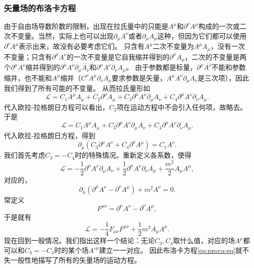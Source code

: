 \documentclass[hyperref, UTF8, a4paper]{ctexart}
\begin{document}
\subsubsection{矢量场的布洛卡方程}

由于自由场导数阶数的限制，出现在拉氏量中的只能是$A^\mu$和$\partial^\nu A^\mu$构成的一次或二次不变量。当然，实际上也可以出现$\partial_\mu A^\nu$或者$\partial_\mu A_\mu$这种，但因为它们都可以使用$\partial^\nu A^\mu$表示出来，故没有必要考虑它们。
只含有$A^\mu$二次不变量为$A^\mu A_\mu$，没有一次不变量；只含有$\partial^\mu A^\nu$的一次不变量是它自我缩并得到的$\partial^\mu A_\mu$，二次的不变量是两个$\partial^\mu A^\nu$缩并得到的$\partial^\mu A^\nu \partial_\mu A_\nu$和$\partial^\mu A^\nu \partial_\nu A_\mu$。
由于参数都是标量，$\partial^\mu A^\nu$不能和参数缩并，也不能和$A^\mu$缩并（$C^\nu A^\mu \partial_\nu A_\mu$要求参数是矢量，$A^\mu A^\nu \partial_\mu A_\nu$是三次项），因此我们得到了所有可能的不变量。
从而拉氏量形如
\[
    \mathcal{L} = C_1 A^\mu A_\mu + C_2 \partial^\mu A_\mu + C_3 \partial^\mu A^\nu \partial_\mu A_\nu + C_4 \partial^\mu A^\nu \partial_\nu A_\mu.
\]
代入欧拉-拉格朗日方程可以看出，$C_2$项在运动方程中不会引入任何项，故略去。
于是
\[
    \mathcal{L} = C_1 A^\mu A_\mu + C_3 \partial^\mu A^\nu \partial_\mu A_\nu + C_4 \partial^\mu A^\nu \partial_\nu A_\mu.
\]
代入欧拉-拉格朗日方程，得到
\begin{equation}
    \partial_\mu (C_3 \partial^\mu A^\nu +  C_4 \partial^\nu A^\mu) = C_1 A^\nu.
    \label{eq:vector-motion-eq}
\end{equation}
我们首先考虑$C_3 = - C_4$时的特殊情况。重新定义各系数，使得
\begin{equation}
    \mathcal{L} = - \frac{1}{2} \partial^\mu A^\nu \partial_\mu A_\nu + \frac{1}{2} \partial^\mu A^\nu \partial_\nu A_\mu + \frac{m^2}{2} A_\mu A^\mu,
\end{equation}
对应的，
\begin{equation}
    \partial_\mu (\partial^\mu A^\nu - \partial^\nu A^\mu) + m^2 A^\nu = 0.
    \label{eq:proca-eq}
\end{equation}
常定义
\begin{equation}
    F^{\mu \nu} = \partial^\mu A^\nu - \partial^\nu A^\mu,
\end{equation}
于是就有
\begin{equation}
    \mathcal{L} = - \frac{1}{4} F_{\mu \nu} F^{\mu \nu} + \frac{1}{2} m^2 A_\mu A^\mu.
    \label{eq:proca-lagrangian}
\end{equation}
现在回到一般情况。我们指出这样一个结论：无论$C_3,C_4$取什么值，对应的场$A^\mu$都可以和$C_3 = - C_4$时的某个场${A'}^\mu$建立一一对应。
因此布洛卡方程\eqref{eq:proca-eq}就不失一般性地描写了所有的矢量场的运动方程。
\end{document}

